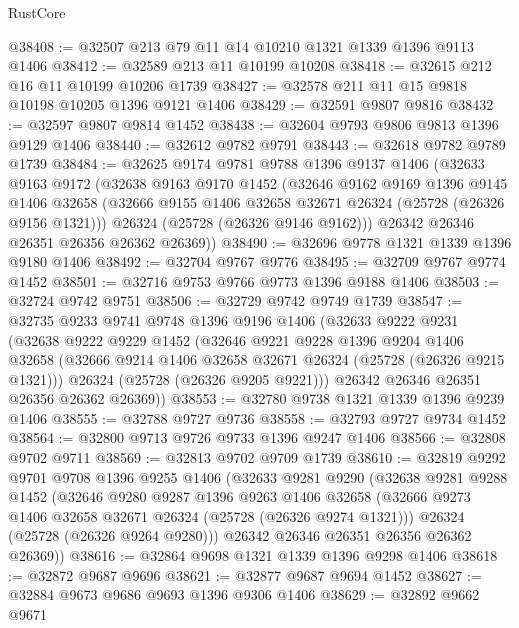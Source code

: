 \begin{lexlean}{RustCore}
\begin{coremodule}
@38408 := @32507 @213 @79 @11 @14 @10210 @1321 @1339 @1396 @9113 @1406
@38412 := @32589 @213 @11 @10199 @10208
@38418 := @32615 @212 @16 @11 @10199 @10206 @1739
@38427 := @32578 @211 @11 @15 @9818 @10198 @10205 @1396 @9121 @1406
@38429 := @32591 @9807 @9816
@38432 := @32597 @9807 @9814 @1452
@38438 := @32604 @9793 @9806 @9813 @1396 @9129 @1406
@38440 := @32612 @9782 @9791
@38443 := @32618 @9782 @9789 @1739
@38484 := @32625
    @9174
    @9781
    @9788
    @1396
    @9137
    @1406
    (@32633
      @9163
      @9172
      (@32638
        @9163
        @9170
        @1452
        (@32646
          @9162
          @9169
          @1396
          @9145
          @1406
          @32658
          (@32666 @9155 @1406 @32658 @32671 @26324 (@25728 (@26326 @9156 @1321)))
          @26324
          (@25728 (@26326 @9146 @9162)))
        @26342
        @26346
        @26351
        @26356
        @26362
        @26369))
@38490 := @32696 @9778 @1321 @1339 @1396 @9180 @1406
@38492 := @32704 @9767 @9776
@38495 := @32709 @9767 @9774 @1452
@38501 := @32716 @9753 @9766 @9773 @1396 @9188 @1406
@38503 := @32724 @9742 @9751
@38506 := @32729 @9742 @9749 @1739
@38547 := @32735
    @9233
    @9741
    @9748
    @1396
    @9196
    @1406
    (@32633
      @9222
      @9231
      (@32638
        @9222
        @9229
        @1452
        (@32646
          @9221
          @9228
          @1396
          @9204
          @1406
          @32658
          (@32666 @9214 @1406 @32658 @32671 @26324 (@25728 (@26326 @9215 @1321)))
          @26324
          (@25728 (@26326 @9205 @9221)))
        @26342
        @26346
        @26351
        @26356
        @26362
        @26369))
@38553 := @32780 @9738 @1321 @1339 @1396 @9239 @1406
@38555 := @32788 @9727 @9736
@38558 := @32793 @9727 @9734 @1452
@38564 := @32800 @9713 @9726 @9733 @1396 @9247 @1406
@38566 := @32808 @9702 @9711
@38569 := @32813 @9702 @9709 @1739
@38610 := @32819
    @9292
    @9701
    @9708
    @1396
    @9255
    @1406
    (@32633
      @9281
      @9290
      (@32638
        @9281
        @9288
        @1452
        (@32646
          @9280
          @9287
          @1396
          @9263
          @1406
          @32658
          (@32666 @9273 @1406 @32658 @32671 @26324 (@25728 (@26326 @9274 @1321)))
          @26324
          (@25728 (@26326 @9264 @9280)))
        @26342
        @26346
        @26351
        @26356
        @26362
        @26369))
@38616 := @32864 @9698 @1321 @1339 @1396 @9298 @1406
@38618 := @32872 @9687 @9696
@38621 := @32877 @9687 @9694 @1452
@38627 := @32884 @9673 @9686 @9693 @1396 @9306 @1406
@38629 := @32892 @9662 @9671

\end{coremodule}
\end{lexlean}
